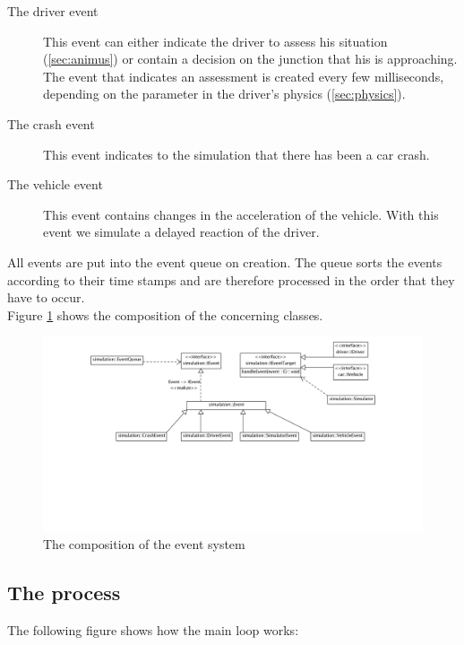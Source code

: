 \begin{description}
\item[The driver event] This event can either indicate the driver
to assess his situation (\ref{sec:animus}) or contain a decision on the 
junction that his is approaching. The event that indicates an assessment
is created every few milliseconds, depending on the parameter in the driver's
physics (\ref{sec:physics}).
\item[The crash event]
This event indicates to the simulation that there has been a car crash.
\item[The vehicle event]
This event contains changes in the acceleration of the vehicle. With this 
event we simulate a delayed reaction of the driver.
\end{description}

\noindent All events are put into the event queue on creation. The queue sorts the
events according to their time stamps and are therefore processed in the
order that they have to occur. \\

\noindent Figure \ref{fig:eventSystem} shows the composition of the 
concerning classes. \\

\begin{figure}[H]
\begin{center}
\includegraphics[width=\textwidth]{images/eventsystem.png}
\end{center}
\caption{The composition of the event system}
\label{fig:eventSystem}
\end{figure}

\subsection{The process}

The following figure shows how the main loop works:

